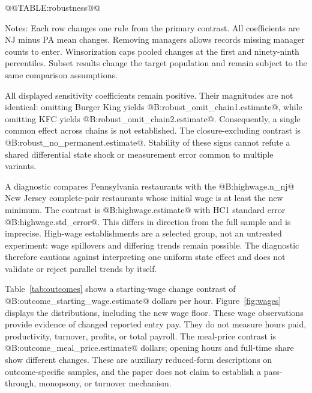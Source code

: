 \documentclass[11pt]{article}
\begin{document}
\begin{table}[htbp]\centering
\caption{Sensitivity of the employment contrast}\label{tab:robust}
@@TABLE:robustness@@
\begin{minipage}{.95\linewidth}\small\medskip
Notes: Each row changes one rule from the primary contrast. All coefficients are NJ minus PA mean changes. Removing managers allows records missing manager counts to enter. Winsorization caps pooled changes at the first and ninety-ninth percentiles. Subset results change the target population and remain subject to the same comparison assumptions.
\end{minipage}
\end{table}

All displayed sensitivity coefficients remain positive. Their magnitudes are not identical: omitting Burger King yields @B:robust_omit_chain1.estimate@, while omitting KFC yields @B:robust_omit_chain2.estimate@. Consequently, a single common effect across chains is not established. The closure-excluding contrast is @B:robust_no_permanent.estimate@. Stability of these signs cannot refute a shared differential state shock or measurement error common to multiple variants. %

A diagnostic compares Pennsylvania restaurants with the @B:highwage.n_nj@ New Jersey complete-pair restaurants whose initial wage is at least the new minimum. The contrast is @B:highwage.estimate@ with HC1 standard error @B:highwage.std_error@. This differs in direction from the full sample and is imprecise. High-wage establishments are a selected group, not an untreated experiment: wage spillovers and differing trends remain possible. The diagnostic therefore cautions against interpreting one uniform state effect and does not validate or reject parallel trends by itself. %

Table~\ref{tab:outcomes} shows a starting-wage change contrast of @B:outcome_starting_wage.estimate@ dollars per hour. Figure~\ref{fig:wages} displays the distributions, including the new wage floor. These wage observations provide evidence of changed reported entry pay. They do not measure hours paid, productivity, turnover, profits, or total payroll. The meal-price contrast is @B:outcome_meal_price.estimate@ dollars; opening hours and full-time share show different changes. These are auxiliary reduced-form descriptions on outcome-specific samples, and the paper does not claim to establish a pass-through, monopsony, or turnover mechanism. %
\end{document}
